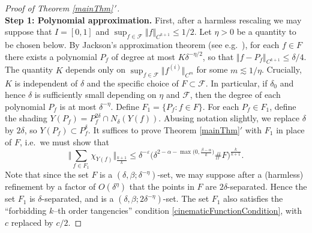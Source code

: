 \documentclass[letterpaper, reqno,11pt]{article}
\numberwithin{equation}{section}
\newcommand{\eps}{\varepsilon}
\numberwithin{thm}{section}
\theoremstyle{remark}
\begin{document}
\begin{proof}[Proof of Theorem \ref{mainThm}\,$'$]
%
$\phantom{1}$\\
\noindent\textbf{Step 1: Polynomial approximation.}
First, after a harmless rescaling we may suppose that $I=[0,1]$ and $\sup_{f\in\mathcal{F}}\Vert f \Vert_{C^{k+1}}\leq 1/2$. Let $\eta>0$ be a quantity to be chosen below. By Jackson's approximation theorem (see e.g.~\cite{BBL}), for each $f\in F$ there exists a polynomial $P_f$ of degree at most $K\delta^{-\eta/2}$, so that $\Vert f-P_f\Vert_{C^{k+1}}\leq \delta/4$. The quantity $K$ depends only on $\sup_{f\in \mathcal{F}}\Vert f^{(i)} \Vert_{C^m}$ for some $m\lesssim 1/\eta$. Crucially, $K$ is independent of $\delta$ and the specific choice of $F\subset\mathcal{F}$. In particular, if $\delta_0$ and hence $\delta$ is sufficiently small depending on $\eta$ and $\mathcal{F}$, then the degree of each polynomial $P_f$ is at most $\delta^{-\eta}$. Define $F_1=\{P_f\colon f\in F\}$. For each $P_f\in F_1$, define the shading $Y(P_f) = P_f^{2\delta}\cap N_{\delta}(Y(f))$. Abusing notation slightly, we replace $\delta$ by $2\delta$, so $Y(P_f)\subset P_f^\delta$. It suffices to prove Theorem \ref{mainThm}$'$ with $F_1$ in place of $F$, i.e.~we must show that
%
\begin{equation}\label{polyApproxBd}
\Big\Vert \sum_{f\in F_1} \chi_{Y(f)} \Big\Vert_{\frac{k+1}{k}} \leq  \delta^{-\eps}\big( \delta^{2-\alpha-\max\big(0, \frac{\beta-\alpha}{k}\big)}\#F\big)^{\frac{k}{k+1}}.
\end{equation}
%
Note that since the set $F$ is a $(\delta,\beta;\delta^{-\eta})$-set, we may suppose after a (harmless) refinement by a factor of $O(\delta^{\eta})$ that the points in $F$ are $2\delta$-separated. Hence the set $F_1$ is $\delta$-separated, and is a $(\delta, \beta; 2\delta^{-\eta})$-set. The set $F_1$ also satisfies the ``forbidding $k$--th order tangencies'' condition \eqref{cinematicFunctionCondition}, with $c$ replaced by $c/2$.

\medskip


\end{proof}
\end{document}
